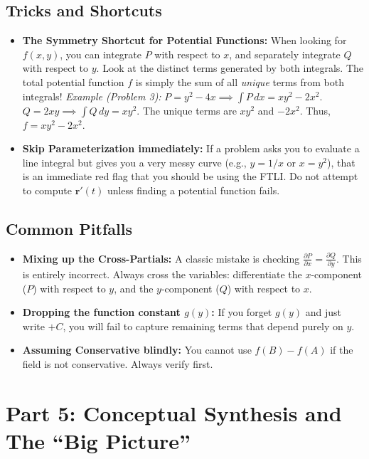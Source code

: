 \documentclass[12pt]{article}
\begin{document}
\subsection{Tricks and Shortcuts}
\begin{itemize}
    \item \textbf{The Symmetry Shortcut for Potential Functions:} When looking for $f(x,y)$, you can integrate $P$ with respect to $x$, and separately integrate $Q$ with respect to $y$. Look at the distinct terms generated by both integrals. The total potential function $f$ is simply the sum of all \textit{unique} terms from both integrals! 
    \textit{Example (Problem 3):} $P = y^2 - 4x \implies \int P \, dx = xy^2 - 2x^2$. $Q = 2xy \implies \int Q \, dy = xy^2$. The unique terms are $xy^2$ and $-2x^2$. Thus, $f = xy^2 - 2x^2$.
    \item \textbf{Skip Parameterization immediately:} If a problem asks you to evaluate a line integral but gives you a very messy curve (e.g., $y = 1/x$ or $x = y^2$), that is an immediate red flag that you should be using the FTLI. Do not attempt to compute $\mathbf{r}'(t)$ unless finding a potential function fails.
\end{itemize}

\subsection{Common Pitfalls}
\begin{itemize}
    \item \textbf{Mixing up the Cross-Partials:} A classic mistake is checking $\frac{\partial P}{\partial x} = \frac{\partial Q}{\partial y}$. This is entirely incorrect. Always cross the variables: differentiate the $x$-component ($P$) with respect to $y$, and the $y$-component ($Q$) with respect to $x$.
    \item \textbf{Dropping the function constant $g(y)$:} If you forget $g(y)$ and just write $+ C$, you will fail to capture remaining terms that depend purely on $y$.
    \item \textbf{Assuming Conservative blindly:} You cannot use $f(B) - f(A)$ if the field is not conservative. Always verify first.
\end{itemize}

\newpage
\section{Part 5: Conceptual Synthesis and The ``Big Picture''}
\end{document}
